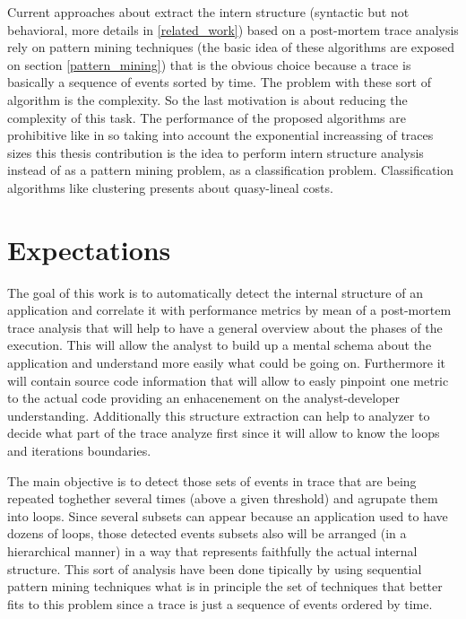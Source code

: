 Current approaches about extract the intern structure (syntactic but not
behavioral, more details in \ref{related_work}) based on a post-mortem trace
analysis rely on pattern mining techniques (the basic idea of these algorithms 
are exposed on section \ref{pattern_mining}) that is the obvious choice because 
a trace is basically a sequence of events sorted by time. The problem with these 
sort of algorithm is the complexity. So the last motivation is about reducing the 
complexity of this task. The performance of the proposed algorithms are
prohibitive like in \cite{trahay2015selecting} \cite{Safyallah2006}
\cite{Lopez-Cueva2012} so taking into account the exponential increassing of 
traces sizes this thesis contribution is the idea to perform intern structure 
analysis instead of as a pattern mining problem, as a classification problem. 
Classification algorithms like clustering presents about quasy-lineal costs.


\section{Expectations}

The goal of this work is to automatically detect the internal structure of an 
application and correlate it with performance metrics by mean of a post-mortem 
trace analysis that will help to have a general overview about the phases of the 
execution. This will allow the analyst to build up a mental schema about the
application and understand more easily what could be going on. Furthermore it will 
contain source code information that will allow to easly pinpoint one metric to 
the actual code providing an enhacenement on the analyst-developer
understanding. Additionally this structure extraction can help to analyzer to 
decide what part of the trace analyze first since it will allow to know the loops 
and iterations boundaries.

The main objective is to detect those sets of events in trace that are being
repeated toghether several times (above a given threshold) and agrupate them into 
loops. Since several subsets can appear because an application used to have 
dozens of loops, those detected events subsets also will be arranged (in a 
hierarchical manner) in a way that represents faithfully the actual internal 
structure. This sort of analysis have been done tipically by using sequential 
pattern mining techniques what is in principle the set of techniques that better 
fits to this problem since a trace is just a sequence of events ordered by time.

